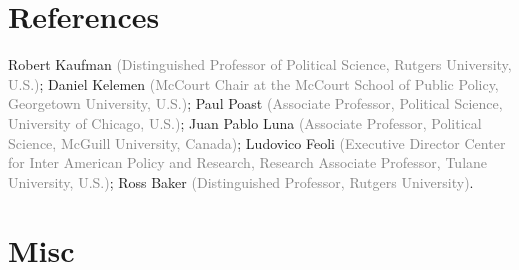 \documentclass[letterpaper]{article}
\begin{document}


\section*{References}

 Robert Kaufman {\textcolor{gray}{\scriptsize (Distinguished Professor of Political Science, Rutgers University, U.S.)}};  Daniel Kelemen {\textcolor{gray}{\scriptsize (McCourt Chair at the McCourt School of Public Policy, Georgetown University, U.S.)}}; Paul Poast {\textcolor{gray}{\scriptsize (Associate Professor, Political Science, University of Chicago, U.S.)}}; Juan Pablo Luna {\textcolor{gray}{\scriptsize (Associate Professor, Political Science, McGuill University, Canada)}}; Ludovico Feoli {\textcolor{gray}{\scriptsize (Executive Director Center for Inter American Policy and Research, Research Associate Professor, Tulane University, U.S.)}}; Ross Baker {\textcolor{gray}{\scriptsize (Distinguished Professor, Rutgers University)}}.



\section*{Misc}
{\unskip}




\bigskip
\end{document}
